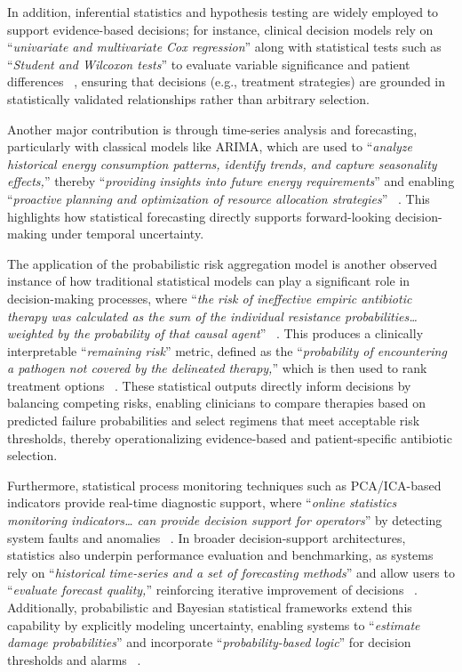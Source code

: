 \documentclass{sfuthesis}
\begin{document}
In addition, inferential statistics and hypothesis testing are widely employed to support evidence-based decisions; for instance, clinical decision models rely on “\textit{univariate and multivariate Cox regression}” along with statistical tests such as “\textit{Student and Wilcoxon tests}” to evaluate variable significance and patient differences ~\cite{wang2023data}, ensuring that decisions (e.g., treatment strategies) are grounded in statistically validated relationships rather than arbitrary selection.\par 
Another major contribution is through time-series analysis and forecasting, particularly with classical models like ARIMA, which are used to “\textit{analyze historical energy consumption patterns, identify trends, and capture seasonality effects,}” thereby “\textit{providing insights into future energy requirements}” and enabling “\textit{proactive planning and optimization of resource allocation strategies}” ~\cite{krishnan2024data}. This highlights how statistical forecasting directly supports forward-looking decision-making under temporal uncertainty.\par
The application of the probabilistic risk aggregation model is another observed instance of how traditional statistical models can play a significant role in decision-making processes, where “\textit{the risk of ineffective empiric antibiotic therapy was calculated as the sum of the individual resistance probabilities…weighted by the probability of that causal agent}” ~\cite{muller2021risk}. This produces a clinically interpretable “\textit{remaining risk}” metric, defined as the “\textit{probability of encountering a pathogen not covered by the delineated therapy,}” which is then used to rank treatment options ~\cite{muller2021risk}. These statistical outputs directly inform decisions by balancing competing risks, enabling clinicians to compare therapies based on predicted failure probabilities and select regimens that meet acceptable risk thresholds, thereby operationalizing evidence-based and patient-specific antibiotic selection.\par
Furthermore, statistical process monitoring techniques such as PCA/ICA-based indicators provide real-time diagnostic support, where “\textit{online statistics monitoring indicators… can provide decision support for operators}” by detecting system faults and anomalies ~\cite{kim2025development}. In broader decision-support architectures, statistics also underpin performance evaluation and benchmarking, as systems rely on “\textit{historical time-series and a set of forecasting methods}” and allow users to “\textit{evaluate forecast quality,}” reinforcing iterative improvement of decisions ~\cite{Kozielski2021LPGDSS}. Additionally, probabilistic and Bayesian statistical frameworks extend this capability by explicitly modeling uncertainty, enabling systems to “\textit{estimate damage probabilities}” and incorporate “\textit{probability-based logic}” for decision thresholds and alarms ~\cite{Monti2025RailwayBridgeDSS}.
\end{document}
